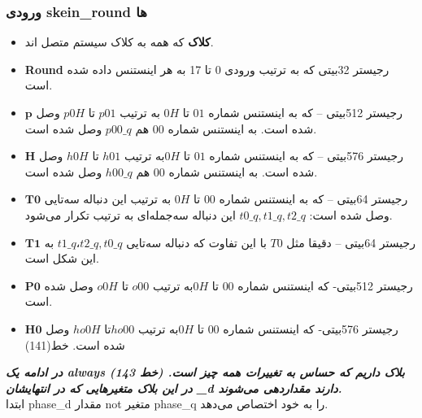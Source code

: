 \subsubsection{
	ورودی skein\_round ها
}
\begin{itemize}
	\item
	      \textbf{کلاک}
	      که همه به کلاک سیستم متصل اند.
	\item
	      \textbf{Round}
	      رجیستر 32بیتی که به ترتیب ورودی 0 تا 17 به هر اینستنس داده شده است.
	\item
	      \textbf{$\textbf{p}$} 
	      رجیستر 512بیتی – که به اینستنس شماره $01$ تا $0H$ به ترتیب $p01$ تا $p0H$ وصل شده است. به اینستنس شماره $00$ هم $p00\_q$ وصل شده است.
	\item
	      \textbf{$\textbf{H}$}
	      رجیستر 576بیتی – که به اینستنس شماره $01$ تا $0H $به ترتیب $h01$ تا $h0H$ وصل شده است. به اینستنس شماره $00$ هم $h00\_q$ وصل شده است.
	\item
	      \textbf{$\textbf{T0}$}
	      رجیستر 64بیتی –   که به اینستنس شماره $00$ تا $0H$ به ترتیب این دنباله سه‌تایی وصل شده است:
	      $t0\_q, t1\_q, t2\_q$
	      این دنباله سه‌جمله‌ای به ترتیب تکرار می‌شود.
	\item
	      \textbf{$\textbf{T1}$}
	      رجیستر 64بیتی – دقیقا مثل $T0$ با این تفاوت که دنباله سه‌تایی $ t1\_q، t2\_q, t0\_q $ به این شکل است.
	\item
	      \textbf{$\textbf{P0}$}
	      رجیستر 512بیتی- که اینستنس شماره $00$ تا $0H$به ترتیب $o00$ تا $o0H$ وصل شده است. 
	\item
	      \textbf{$\textbf{H0}$}
	      رجیستر 576بیتی- که اینستنس شماره $00$ تا $0H $به ترتیب $ho00 $تا $ho0H$ وصل شده است. خط(141)
	      
\end{itemize}
\textit{\textbf{
	در ادامه یک always بلاک داریم که حساس به تغییرات همه چیز است. (خط 143)
	در این بلاک متغیرهایی که در انتهایشان
	\_d
دارند مقداردهی می‌شوند.}}\\
\newline
ابتدا phase\_d مقدار not متغیر phase\_q را به خود اختصاص می‌دهد.
